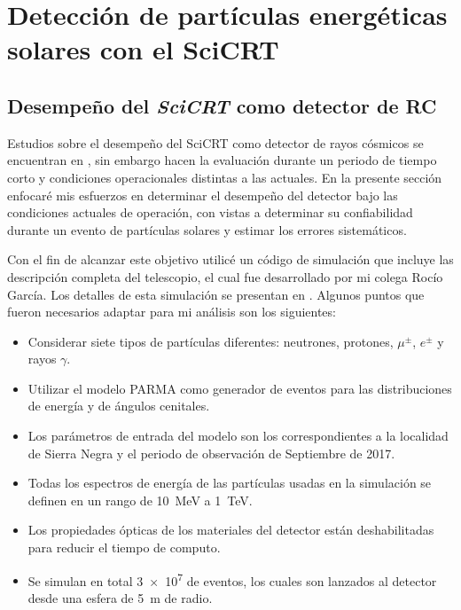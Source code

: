 
\chapter{Detección de partículas energéticas\\ solares con el SciCRT}
\label{chap:cuatro}
\section{Desempeño del \emph{SciCRT} como detector de RC}

Estudios sobre el desempeño del SciCRT como detector de rayos cósmicos se encuentran en \cite{ynagai14,ysasai14}, sin embargo hacen la evaluación durante un periodo de tiempo corto y condiciones operacionales distintas a las actuales. En la presente sección enfocaré mis esfuerzos en determinar el desempeño del detector bajo las condiciones actuales de operación, con vistas a determinar su confiabilidad durante un evento de partículas solares y estimar los errores sistemáticos.

Con el fin de alcanzar este objetivo utilicé un código de simulación que incluye las descripción completa del telescopio, el cual fue desarrollado por mi colega Rocío García. Los detalles de esta simulación se presentan en \cite{garcia20}. Algunos puntos que fueron necesarios adaptar para mi análisis son los siguientes:

\begin{itemize}
  \item Considerar siete tipos de partículas diferentes: neutrones, protones, $\mu^{\pm}$, $e^{\pm}$ y rayos $\gamma$.
  \item Utilizar el modelo PARMA como generador de eventos para las distribuciones de energía y de ángulos cenitales.
  \item Los parámetros de entrada del modelo son los correspondientes a la localidad de Sierra Negra y el periodo de observación de Septiembre de \num{2017}.
  \item Todas los espectros de energía de las partículas usadas en la simulación se definen en un rango de \SI{10}{\mega\electronvolt} a \SI{1}{\tera\electronvolt}.
  \item Los propiedades ópticas de los materiales del detector están deshabilitadas para reducir el tiempo de computo.
  \item Se simulan en total \num{3e7} de eventos, los cuales son lanzados al detector desde una esfera de \SI{5}{\metre} de radio.
\end{itemize}

